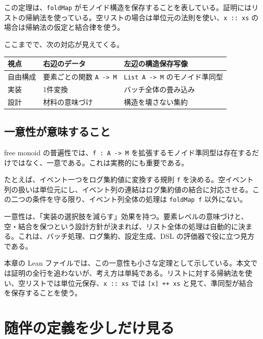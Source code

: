 この定理は、\texttt{foldMap} がモノイド構造を保存することを表している。証明にはリストの帰納法を使っている。空リストの場合は単位元の法則を使い、\texttt{x :: xs} の場合は帰納法の仮定と結合律を使う。

ここまでで、次の対応が見えてくる。

\begin{center}
\begin{tabular}{lll}
\toprule
視点 & 右辺のデータ & 左辺の構造保存写像 \\
\midrule
自由構成 & 要素ごとの関数 \texttt{A -> M} & \texttt{List A -> M} のモノイド準同型 \\
実装 & 1件変換 & バッチ全体の畳み込み \\
設計 & 材料の意味づけ & 構造を壊さない集約 \\
\bottomrule
\end{tabular}
\end{center}

\subsection{一意性が意味すること}

free monoid の普遍性では、\texttt{f : A -> M} を拡張するモノイド準同型は存在するだけではなく、一意である。これは実務的にも重要である。

たとえば、イベント一つをログ集約値に変換する規則 \texttt{f} を決める。空イベント列の扱いは単位元にし、イベント列の連結はログ集約値の結合に対応させる。この二つの条件を守る限り、イベント列全体の処理は \texttt{foldMap f} 以外にない。

\begin{softwarebox}
一意性は、「実装の選択肢を減らす」効果を持つ。要素レベルの意味づけと、空・結合を保つという設計方針が決まれば、リスト全体の処理は自動的に決まる。これは、バッチ処理、ログ集約、設定生成、DSL の評価器で役に立つ見方である。
\end{softwarebox}

本章の Lean ファイルでは、この一意性も小さな定理として示している。本文では証明の全行を追わないが、考え方は単純である。リストに対する帰納法を使い、空リストでは単位元保存、\texttt{x :: xs} では \texttt{[x] ++ xs} と見て、準同型が結合を保存することを使う。

\section{随伴の定義を少しだけ見る}
\label{sec:ch31-adjunction-definition}

